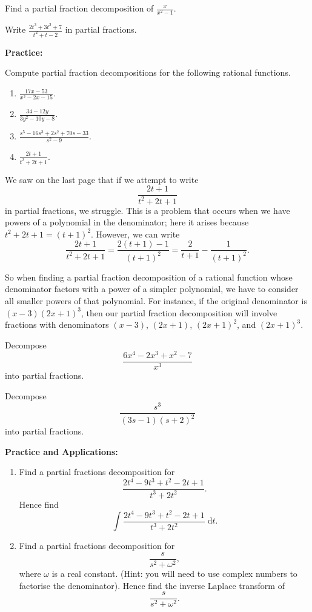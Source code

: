 \documentclass{article}
\newcommand{\diff}{\;\mathrm{d}}
\begin{document}
Find a partial fraction decomposition of $\frac{x}{x^2-1}$.

\vfill



Write $\frac{2t^3+3t^2+7}{t^2+t-2}$ in partial fractions.



\clearpage


\textbf{Practice:}\bigskip

Compute partial fraction decompositions for the following rational functions.

\begin{enumerate}
	\item $\frac{17x-53}{x^2-2x-15}$.
	\item $\frac{34-12y}{3y^2-10y-8}$.
	\item $\frac{s^5-16s^3+2s^2+70s-33}{s^2-9}$.
	\item $\frac{2t+1}{t^2+2t+1}$.
\end{enumerate}


\clearpage


We saw on the last page that if we attempt to write
\[\frac{2t+1}{t^2+2t+1}\]
in partial fractions, we struggle. This is a problem that occurs when we have powers of a polynomial in the denominator; here it arises because $t^2+2t+1=(t+1)^2$. However, we can write
\[\frac{2t+1}{t^2+2t+1}=\frac{2(t+1)-1}{(t+1)^2}=\frac{2}{t+1}-\frac{1}{(t+1)^2}.\]

So when finding a partial fraction decomposition of a rational function whose denominator factors with a power of a simpler polynomial, we have to consider all smaller powers of that polynomial. For instance, if the original denominator is $(x-3)(2x+1)^3$, then our partial fraction decomposition will involve fractions with denominators $(x-3)$, $(2x+1)$, $(2x+1)^2$, and $(2x+1)^3$.\bigskip

Decompose
\[\frac{6x^4-2x^3+x^2-7}{x^3}\]
into partial fractions.

\vfill

Decompose
\[\frac{s^3}{(3s-1)(s+2)^2}\]
into partial fractions.


\clearpage



\textbf{Practice and Applications:}\bigskip


\begin{enumerate}
	\item Find a partial fractions decomposition for
		\[\frac{2t^4-9t^3+t^2-2t+1}{t^3+2t^2}.\]
		Hence find
		\[\int \frac{2t^4-9t^3+t^2-2t+1}{t^3+2t^2}\diff t.\]
	\item Find a partial fractions decomposition for
		\[\frac{s}{s^2+\omega^2},\]
		where $\omega$ is a real constant. (Hint: you will need to use complex numbers to factorise the denominator). Hence find the inverse Laplace transform of
		\[\frac{s}{s^2+\omega^2}.\]
\end{enumerate}
\end{document}
